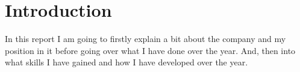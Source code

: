 \section{Introduction}{
	In this report I am going to firstly explain a bit about the company and my position in it before going over what I have done over the year. And, then into what skills I have gained and how I have developed over the year.
}